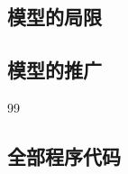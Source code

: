 \documentclass[withoutpreface,bwprint]{cumcmthesis}
\begin{document}
\subsection{模型的局限}

\subsection{模型的推广}

\begin{thebibliography}{99}
\end{thebibliography}


\begin{appendices}
\section{全部程序代码}

\end{appendices}
\end{document}
